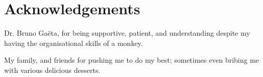\chapter*{Acknowledgements}\label{ack}

Dr. Bruno Ga\"{e}ta, for being supportive, patient, and understanding despite my having the organisational skills of a monkey.

My family, and friends for pushing me to do my best; sometimes even bribing me with various delicious desserts.
